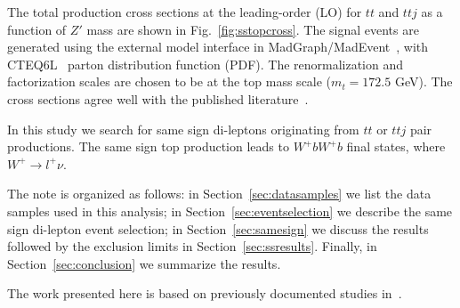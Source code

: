 The total production cross sections at the leading-order (LO) for $tt$ and $ttj$ as a function of $Z'$ 
mass are shown in Fig.~\ref{fig:sstopcross}. The signal events are generated using the external model interface in 
MadGraph/MadEvent~\cite{madgraph}, with CTEQ6L~\cite{cteq6l} parton distribution function (PDF). The renormalization and factorization
scales are chosen to be at the top mass scale ($m_{t} = 172.5$ GeV). The cross sections agree well with the published
literature~\cite{berger}. 

In this study we search for same sign di-leptons originating from $tt$ or $ttj$ pair productions. The same sign top
production leads to $W^+ b W^+ b$ final states, where $W^+ \rightarrow l^+ \nu$. 

The note is organized as follows: in Section~\ref{sec:datasamples} we list the data samples used in this analysis; 
in Section~\ref{sec:eventselection} we describe the same sign di-lepton event selection; in Section~\ref{sec:samesign} 
we discuss the results followed by the exclusion limits in Section~\ref{sec:ssresults}. Finally, in Section~\ref{sec:conclusion} 
we summarize the results.  

The work presented here is based on previously documented studies in~\cite{ssnote1, sspaper}.

 



